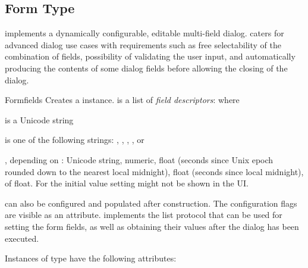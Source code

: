 \subsection{Form Type}
\label{subsec:form}
 implements a dynamically configurable, editable multi-field 
dialog.  caters for advanced dialog use cases with requirements 
such as free selectability of the combination of fields, possibility of 
validating the user input, and automatically producing the contents of some 
dialog fields before allowing the closing of the dialog. 

\begin{classdesc}{Form}{fields}
Creates a  instance.
 is a list of \emph{field descriptors}:  where

 is a Unicode string

 is one of the following strings: 
, , , , 
or 

, depending on : Unicode string, numeric, float (seconds 
since Unix epoch rounded down to the nearest local midnight), float (seconds 
since local midnight),  of float. For 
  the initial value setting might not be shown in the 
UI.
\end{classdesc}

 can also be configured and populated after construction. The 
configuration flags are visible as an attribute.  implements 
the list protocol that can be used for setting the form fields, as well as 
obtaining their values after the dialog has been executed.

Instances of  type have the following attributes:

